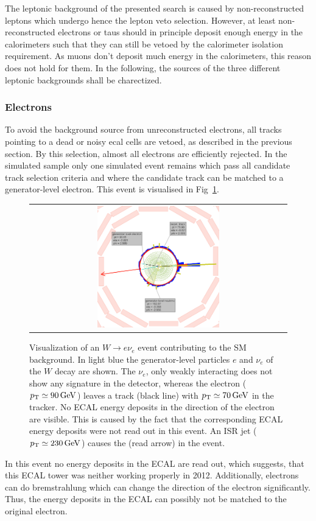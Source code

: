 The leptonic background of the presented search is caused by non-reconstructed leptons which undergo hence the lepton veto selection.
However, at least non-reconstructed electrons or taus should in principle deposit enough energy in the calorimeters such that they can still be vetoed by the calorimeter isolation requirement.
As muons don't deposit much energy in the calorimeters, this reason does not hold for them.
In the following, the sources of the three different leptonic backgrounds shall be charectized.

\subsubsection*{Electrons}
To avoid the background source from unreconstructed electrons, all tracks pointing to a dead or noisy ecal cells are vetoed, as described in the previous section.
By this selection, almost all electrons are efficiently rejected.
In the simulated \WJets sample only one simulated event remains which pass all candidate track selection criteria and where the candidate track can be matched to a generator-level electron.
This event is visualised in Fig~\ref{fig:LostElectron}. 
\begin{figure}[!tb]
  \centering 
  \begin{tabular}{c}
    \includegraphics[width=0.49\textwidth]{figures/analysis/Electron_lumi_279317_event_111637553.png}
  \end{tabular}
  \caption{Visualization of an $W\rightarrow e\nu_e$ event contributing to the SM background. 
           In light blue the generator-level particles $e$ and $\nu_e$ of the $W$ decay are shown. 
           The $\nu_e$, only weakly interacting does not show any signature in the detector, whereas the electron ($p_{\text{T}}\simeq 90\,\text{Ge}\kern-0.06667em\text{V}$) leaves a track (black line) with \mbox{$p_{\text{T}}\simeq 70\,\text{Ge}\kern-0.06667em\text{V}$} in the tracker. 
           No ECAL energy deposits in the direction of the electron are visible. 
           This is caused by the fact that the corresponding ECAL energy deposits were not read out in this event.
           An ISR jet ($p_{\text{T}}\simeq 230\,\text{Ge}\kern-0.06667em\text{V}$) causes the \met (read arrow) in the event. }
  \label{fig:LostElectron}
\end{figure}
In this event no energy deposits in the ECAL are read out, which suggests, that this ECAL tower was neither working properly in 2012.
Additionally, electrons can do bremstrahlung which can change the direction of the electron significantly.
Thus, the energy deposits in the ECAL can possibly not be matched to the original electron.


